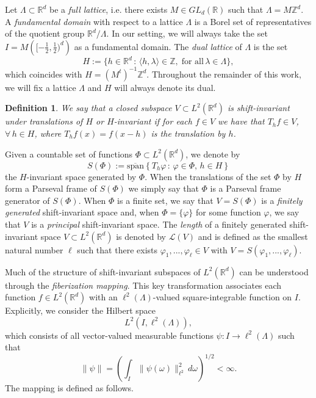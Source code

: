 \documentclass[a4paper,11pt]{amsart}
\newtheorem{fed}{Definition}[section]
\theoremstyle{definition}
\theoremstyle{definition}
\def\la{\lambda}
\def\La{\Lambda}
\def\Z{\mathbb{Z}}
\def\R{\mathbb{R}}
\begin{document}
	Let $\La\subset\R^d$ be a  \textit{full lattice}, i.e. there exists $M\in GL_d(\R)$ such that $\La = M\Z^d$. A  \textit{fundamental domain} with respect to a lattice $\La$ is a Borel set of representatives of the quotient group $\R^d/\La$. In our setting, we will always take the set $I=M\left([-\frac12,\frac12)^d\right)$ as a fundamental domain. The  \textit{dual lattice} of $\La$ is the set
	$$H:=\{h\in\R^d\,:\, \langle h,\la \rangle \in \Z, \; \text{for all} \, \la\in\La\},$$
	which coincides with $H=(M^{t})^{-1}\Z^d$.
	Throughout the remainder of this work, we will fix a lattice $\La$ and $H$ will always denote its dual.
	
	\begin{fed}
		We say that a closed subspace $V\subset L^2(\mathbb R^d)$ is shift-invariant under translations of $H$ or {\it $H$-invariant} if for each $f\in V$ we have that $T_h f\in V$, $\forall\,h \in H$, where $T_h f(x)= f(x-h)$ is the translation by $h$.
	\end{fed}
	
	Given a countable set of functions $\Phi\subset L^2(\mathbb R^d)$, we denote by 
	$$S(\Phi) := \overline{\text{span}} \left\{ T_h\varphi\,:\,\varphi \in \Phi, \,h\in H \right\}$$
	the $H$-invariant space generated by $\Phi$. 
	When the translations of the set $\Phi$ by $H$ form a Parseval frame of $S(\Phi)$ we simply say that $\Phi$ is a Parseval frame generator of $S(\Phi)$.
	When $\Phi$ is a finite set, we say that $V=S(\Phi)$ is a  \textit{finitely generated} shift-invariant space and, when $\Phi=\{\varphi\}$ for some function $\varphi$, we say that $V$ is a  \textit{principal} shift-invariant space. The  \textit{length} of a finitely generated shift-invariant space $V\subset L^2(\R^d)$ is denoted by $\mathcal{L}(V)$ and is defined as the smallest natural number $\ell$ such that there exists $\varphi_{1},...,\varphi_{\ell} \in V$ with $V=S(\varphi_{1},...,\varphi_{\ell})$.
	
	
	Much of the structure of shift-invariant subspaces of $L^2(\R^d)$ can be understood through the  \textit{fiberization mapping}. This key transformation associates each function $f\in L^2(\R^d)$ with an $\ell^2(\La)$-valued square-integrable function on $I$. Explicitly, we consider the Hilbert space $$L^2\left(I,\ell^2(\La)\right),$$ which consists of all vector-valued measurable functions $\psi: I\rightarrow \ell^2(\La)$ such that
	$$\|\psi\|=\left( \int_{I} \|\psi(\omega)\|^2_{\ell^2} \,d\omega\right)^{1/2} < \infty.$$
	The mapping is defined as follows.
	
\end{document}
